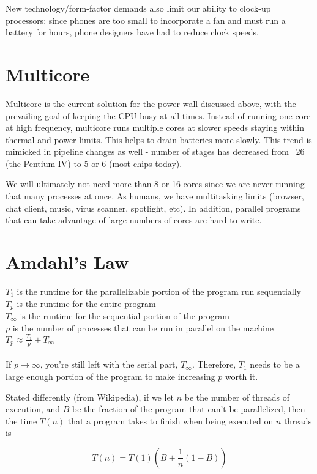 \documentclass[twoside]{article}
\begin{document}
New technology/form-factor demands also limit our ability to clock-up processors: since phones are too small to incorporate a fan and must run a battery for hours, phone designers have had to reduce clock speeds.

\section{Multicore}
Multicore is the current solution for the power wall discussed above, with the prevailing goal of keeping the CPU busy at all times. Instead of running one core at high frequency, multicore runs multiple cores at slower speeds staying within thermal and power limits.  This helps to drain batteries more slowly.  This trend is mimicked in pipeline changes as well - number of stages has decreased from ~26 (the Pentium IV) to 5 or 6 (most chips today).

We will ultimately not need more than 8 or 16 cores since we are never running that many processes at once.  As humans, we have multitasking limits (browser, chat client, music, virus scanner, spotlight, etc).  In addition, parallel programs that can take advantage of large numbers of cores are hard to write.

\section{Amdahl's Law}
$T_1$ is the runtime for the parallelizable portion of the program run sequentially\\
$T_p$ is the runtime for the entire program\\
$T_{\infty}$ is the runtime for the sequential portion of the program\\
$p$ is the number of processes that can be run in parallel on the machine\\
$T_p \approx \frac{T_1}{p} + T_{\infty}$\\
\\
If $p \rightarrow \infty$, you're still left with the serial part, $T_{\infty}$.  Therefore, $T_1$ needs to be a large enough portion of the program to make increasing $p$ worth it.  

Stated differently (from Wikipedia), if we let $n$ be the number of threads of execution, and $B$ be the fraction of the program that can't be parallelized, then the time $T(n)$ that a program takes to finish when being executed on $n$ threads is

$$T(n) = T(1)(B + \frac{1}{n}(1-B))$$
\end{document}

